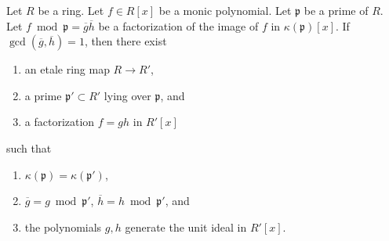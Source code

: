 \begin{lemma}
\label{lemma-factor-mod-lift-etale}
Let $R$ be a ring. Let $f \in R[x]$ be a monic polynomial. Let $\mathfrak p$
be a prime of $R$. Let $f \bmod \mathfrak p = \overline{g} \overline{h}$
be a factorization of the image of $f$ in $\kappa(\mathfrak p)[x]$.
If $\gcd(\overline{g}, \overline{h}) = 1$, then there exist
\begin{enumerate}
\item an etale ring map $R \to R'$,
\item a prime $\mathfrak p' \subset R'$ lying over $\mathfrak p$, and
\item a factorization $f = g h$ in $R'[x]$
\end{enumerate}
such that
\begin{enumerate}
\item $\kappa(\mathfrak p) = \kappa(\mathfrak p')$,
\item $\overline{g} = g \bmod \mathfrak p'$,
$\overline{h} = h \bmod \mathfrak p'$, and
\item the polynomials $g, h$ generate the unit ideal in $R'[x]$.
\end{enumerate}
\end{lemma}

